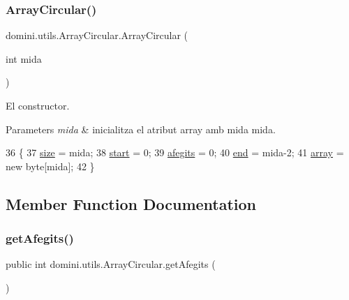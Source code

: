 \subsubsection{\texorpdfstring{Array\+Circular()}{ArrayCircular()}}
{\footnotesize\ttfamily domini.\+utils.\+Array\+Circular.\+Array\+Circular (\begin{DoxyParamCaption}\item[{int}]{mida }\end{DoxyParamCaption})\hspace{0.3cm}{\ttfamily [inline]}}



El constructor. 


\begin{DoxyParams}{Parameters}
{\em mida} & inicialitza el atribut array amb mida mida. \\
\hline
\end{DoxyParams}

\begin{DoxyCode}
36     \{
37         \hyperlink{classdomini_1_1utils_1_1ArrayCircular_a1ffca5e28ff4dc515eddde9cd5926efd}{size} = mida;
38         \hyperlink{classdomini_1_1utils_1_1ArrayCircular_a5206ac4a02c25c16c8a8ed50f65ea87b}{start} = 0;
39         \hyperlink{classdomini_1_1utils_1_1ArrayCircular_a08291d877b2d4c71c219df6f983b279a}{afegits} = 0;
40         \hyperlink{classdomini_1_1utils_1_1ArrayCircular_ad3f40ecb62a2503382fa5d1fa2025912}{end} = mida-2;
41         \hyperlink{classdomini_1_1utils_1_1ArrayCircular_a2af77a58adf605b58d79a1879a0a593f}{array} = \textcolor{keyword}{new} byte[mida];
42     \}
\end{DoxyCode}


\subsection{Member Function Documentation}
\mbox{\label{classdomini_1_1utils_1_1ArrayCircular_a1c65dd3b452fa82ab8827885a7a2fbe1}} 
\subsubsection{\texorpdfstring{get\+Afegits()}{getAfegits()}}
{\footnotesize\ttfamily public int domini.\+utils.\+Array\+Circular.\+get\+Afegits (\begin{DoxyParamCaption}{ }\end{DoxyParamCaption})\hspace{0.3cm}{\ttfamily [inline]}}


